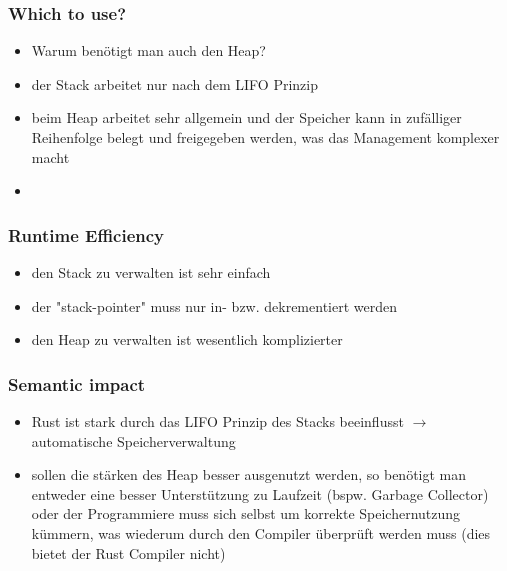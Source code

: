 \documentclass[a4paper,12pt]{article}
\newcommand\mpar[1]{\marginpar {\flushleft\sffamily\scriptsize #1}}
\begin{document}
\subsubsection*{Which to use?} \mpar{siehe Daten-\\strukturen}
	\begin{itemize}
	  \item Warum benötigt man auch den Heap?
	  \item der Stack arbeitet nur nach dem LIFO Prinzip 
	  \item beim Heap arbeitet sehr allgemein und der Speicher kann in zufälliger Reihenfolge belegt und freigegeben werden, was das Management komplexer macht   
	  \item 
	\end{itemize}
	
\subsubsection*{Runtime Efficiency} 
	\begin{itemize}
	  \item den Stack zu verwalten ist sehr einfach
	  \item der "stack-pointer" muss nur in- bzw. dekrementiert werden
	  \item den Heap zu verwalten ist wesentlich komplizierter
	\end{itemize}

\subsubsection*{Semantic impact} 
	\begin{itemize}
	  \item Rust ist stark durch das LIFO Prinzip des Stacks beeinflusst $\rightarrow$ automatische Speicherverwaltung
	  \item sollen die stärken des Heap besser ausgenutzt werden, so benötigt man entweder eine besser Unterstützung zu Laufzeit (bspw. Garbage Collector) oder der Programmiere muss sich selbst um korrekte Speichernutzung kümmern, was wiederum durch den Compiler überprüft werden muss (dies bietet der Rust Compiler nicht)
	\end{itemize}
\end{document}
